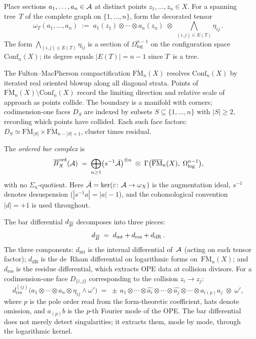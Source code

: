 Place sections $a_1,\dots,a_n\in\mathcal{A}$ at
distinct points $z_1,\dots,z_n \in X$. For a spanning tree~$T$
of the complete graph on $\{1,\dots,n\}$, form the decorated tensor
\[
\omega_T(a_1,\dots,a_n)
\;:=\;
a_1(z_1)\otimes\cdots\otimes a_n(z_n)
\;\otimes\;
\bigwedge_{(i,j)\in E(T)}\eta_{ij}\,.
\]
The form $\bigwedge_{(i,j)\in E(T)}\eta_{ij}$ is a section of
$\Omega^{n-1}_{\log}$ on the configuration space
$\mathrm{Conf}_n(X)$; its degree equals $|E(T)|=n-1$ since
$T$~is a tree.

The Fulton--MacPherson compactification
$\overline{\mathrm{FM}}_n(X)$ resolves $\mathrm{Conf}_n(X)$ by
iterated real oriented blowup along all diagonal strata.
Points of
$\overline{\mathrm{FM}}_n(X)\setminus\mathrm{Conf}_n(X)$
record the limiting direction and relative scale of approach as
points collide. The boundary is a manifold with corners;
codimension-one faces $D_S$ are indexed by subsets
$S\subseteq\{1,\dots,n\}$ with $|S|\ge 2$, recording which
points have collided. Each such face factors:
$D_S \simeq \overline{\mathrm{FM}}_{|S|}
\times \overline{\mathrm{FM}}_{n-|S|+1}$,
cluster times residual.

The \emph{ordered bar complex} is
\[
\overline{B}^{\mathrm{ord}}_X(\mathcal{A})
\;=\;
\bigoplus_{n\ge 1}
\bigl(s^{-1}\bar{\mathcal{A}}\bigr)^{\otimes n}
\;\otimes\;
\Gamma\bigl(\overline{\mathrm{FM}}_n(X),\;
\Omega^{n-1}_{\log}\bigr),
\]
with no $\Sigma_n$-quotient. Here
$\bar{\mathcal{A}} = \ker(\varepsilon\colon\mathcal{A}\to\omega_X)$ is the
augmentation ideal, $s^{-1}$ denotes desuspension
($|s^{-1}a| = |a| - 1$), and the cohomological convention
$|d| = +1$ is used throughout.

The bar differential $d_{\overline{B}}$ decomposes into three pieces:
\begin{equation}\label{eq:pf1-bar-diff}
d_{\overline{B}}
\;=\;
d_{\mathrm{int}} + d_{\mathrm{res}} + d_{\mathrm{dR}}\,.
\end{equation}
The three components: $d_{\mathrm{int}}$ is the internal
differential of~$\mathcal{A}$ (acting on each tensor factor);
$d_{\mathrm{dR}}$ is the de~Rham differential on logarithmic
forms on~$\overline{\mathrm{FM}}_n(X)$; and $d_{\mathrm{res}}$
is the residue differential, which extracts OPE data at collision
divisors. For a codimension-one face $D_{\{i,j\}}$
corresponding to the collision $z_i \to z_j$:
\begin{equation}\label{eq:pf1-res-diff}
d_{\mathrm{res}}^{(ij)}
\bigl(
a_1\otimes\cdots\otimes a_n\otimes\eta_{ij}\wedge\omega'
\bigr)
\;=\;
\pm\,
a_1\otimes\cdots\otimes
\widehat{a_i}\otimes\cdots\otimes
\widehat{a_j}\otimes\cdots\otimes
a_{i(p)}a_j
\;\otimes\;
\omega',
\end{equation}
where $p$ is the pole order read from the form-theoretic coefficient,
hats denote omission, and $a_{(p)}b$ is the $p$-th Fourier mode of
the OPE\@. The bar differential does not merely detect singularities;
it extracts them, mode by mode, through the logarithmic kernel.

